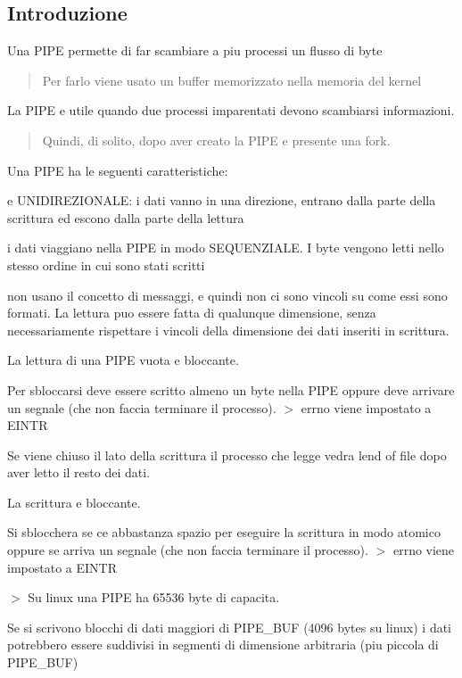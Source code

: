 \subsection*{Introduzione}

Una P\+I\+PE permette di far scambiare a piu\textquotesingle{} processi un flusso di byte \begin{quote}
Per farlo viene usato un buffer memorizzato nella memoria del kernel \end{quote}


La P\+I\+PE e\textquotesingle{} utile quando due processi imparentati devono scambiarsi informazioni. \begin{quote}
Quindi, di solito, dopo aver creato la P\+I\+PE e\textquotesingle{} presente una fork. \end{quote}


Una P\+I\+PE ha le seguenti caratteristiche\+:
\begin{DoxyItemize}
\item e\textquotesingle{} U\+N\+I\+D\+I\+R\+E\+Z\+I\+O\+N\+A\+LE\+: i dati vanno in una direzione, entrano dalla parte della scrittura ed escono dalla parte della lettura
\item i dati viaggiano nella P\+I\+PE in modo S\+E\+Q\+U\+E\+N\+Z\+I\+A\+LE. I byte vengono letti nello stesso ordine in cui sono stati scritti
\item non usano il concetto di messaggi, e quindi non ci sono vincoli su come essi sono formati. La lettura puo\textquotesingle{} essere fatta di qualunque dimensione, senza necessariamente rispettare i vincoli della dimensione dei dati inseriti in scrittura.
\item La lettura di una P\+I\+PE vuota e\textquotesingle{} bloccante.

Per sbloccarsi deve essere scritto almeno un byte nella P\+I\+PE oppure deve arrivare un segnale (che non faccia terminare il processo). $>$ errno viene impostato a E\+I\+N\+TR
\item Se viene chiuso il lato della scrittura il processo che legge vedra\textquotesingle{} l\textquotesingle{}end of file dopo aver letto il resto dei dati.
\item La scrittura e\textquotesingle{} bloccante.

Si sblocchera\textquotesingle{} se c\textquotesingle{}e\textquotesingle{} abbastanza spazio per eseguire la scrittura in modo atomico oppure se arriva un segnale (che non faccia terminare il processo). $>$ errno viene impostato a E\+I\+N\+TR

$>$ Su linux una P\+I\+PE ha 65536 byte di capacita\textquotesingle{}.
\item Se si scrivono blocchi di dati maggiori di {\ttfamily P\+I\+P\+E\+\_\+\+B\+UF} (4096 bytes su linux) i dati potrebbero essere suddivisi in segmenti di dimensione arbitraria (piu\textquotesingle{} piccola di {\ttfamily P\+I\+P\+E\+\_\+\+B\+UF})
\end{DoxyItemize}

